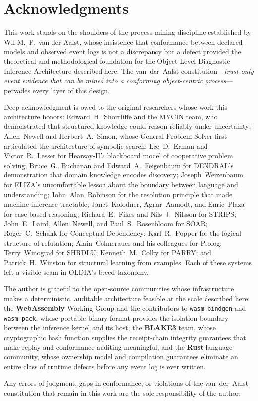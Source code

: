 
\chapter*{Acknowledgments}

This work stands on the shoulders of the process mining discipline established by
Wil M.~P.~van der Aalst, whose insistence that conformance between declared models
and observed event logs is not a discrepancy but a defect provided the theoretical
and methodological foundation for the Object-Level Diagnostic Inference Architecture
described here. The van~der~Aalst constitution---\emph{trust only event evidence
that can be mined into a conforming object-centric process}---pervades every layer
of this design.

Deep acknowledgment is owed to the original researchers whose work this architecture
honors: Edward~H.~Shortliffe and the MYCIN team, who demonstrated that structured
knowledge could reason reliably under uncertainty; Allen~Newell and Herbert~A.~Simon,
whose General Problem Solver first articulated the architecture of symbolic search;
Lee~D.~Erman and Victor~R.~Lesser for Hearsay-II's blackboard model of cooperative
problem solving; Bruce~G.~Buchanan and Edward~A.~Feigenbaum for DENDRAL's demonstration
that domain knowledge encodes discovery; Joseph~Weizenbaum for ELIZA's uncomfortable
lesson about the boundary between language and understanding; John~Alan~Robinson for
the resolution principle that made machine inference tractable;
Janet~Kolodner, Agnar~Aamodt, and Enric~Plaza for case-based reasoning;
Richard~E.~Fikes and Nils~J.~Nilsson for STRIPS; John~E.~Laird,
Allen~Newell, and Paul~S.~Rosenbloom for SOAR; Roger~C.~Schank for
Conceptual Dependency; Karl~R.~Popper for the logical structure of refutation;
Alain~Colmerauer and his colleagues for Prolog; Terry~Winograd for SHRDLU;
Kenneth~M.~Colby for PARRY; and Patrick~H.~Winston for structural learning from
examples. Each of these systems left a visible seam in OLDIA's breed taxonomy.

The author is grateful to the open-source communities whose infrastructure makes
a deterministic, auditable architecture feasible at the scale described here:
the \textbf{WebAssembly} Working Group and the contributors to
\texttt{wasm-bindgen} and \texttt{wasm-pack}, whose portable binary format
provides the isolation boundary between the inference kernel and its host;
the \textbf{BLAKE3} team, whose cryptographic hash function supplies the
receipt-chain integrity guarantees that make replay and conformance auditing
meaningful; and the \textbf{Rust} language community, whose ownership model and
compilation guarantees eliminate an entire class of runtime defects before any
event log is ever written.

Any errors of judgment, gaps in conformance, or violations of the van~der~Aalst
constitution that remain in this work are the sole responsibility of the author.
